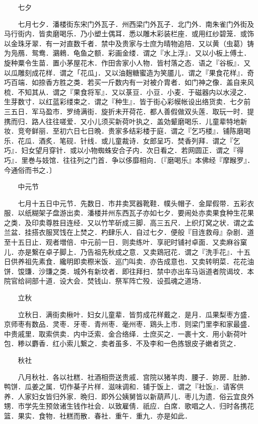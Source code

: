 　　七夕

　　七月七夕．潘楼街东宋门外瓦子．州西梁门外瓦子．北门外．南朱雀门外街及马行街内．皆卖磨喝乐．乃小塑土偶耳．悉以雕木彩装栏座．或用红纱碧笼．或饰以金珠牙翠．有一对直数千者．禁中及贵家与士庶为晴物追陪．又以黄（虫葛）铸为凫鴈．鸳鸯．鸂鶆．龟鱼之额．彩画金缕．谓之『水上浮』．又以小板上傅土．旋种粟令生苗．置小茅屋花木．作田舎家小人物．皆村落之态．语之『谷板』．又以瓜雕刻成花样．谓之「花瓜」．又以油麹糖蜜造为笑靥儿．谓之『果食花样』．奇巧百端．如捺香方胜之类．若买一斤数内有一对被介胄者．如门神之像．盖自来风梳．不知其从．谓之『果食将军』．又以菉豆．小豆．小麦．于磁器内以水浸之．生芽数寸．以红蓝彩缕束之．谓之『种生』．皆于街心彩幙帐设出络货卖．七夕前三五日．军马盈市．罗绮满街．旋折未开荷花．都人善假做双头莲．取玩一时．提携而归．路人往往嗟爱．又小儿须买新荷叶执之．盖効颦磨喝乐．儿童辈特地新妆．竞夸鲜丽．至初六日七日晩．贵家多结彩楼于庭．谓之『乞巧楼』．铺陈磨喝乐．花瓜．酒炙．笔砚．针线．或儿童裁诗．女郎呈巧．焚香列拜．谓之『乞巧』．妇女望月穿针．或以小物蜘蛛安合子内．次日看之．若网圆正．谓之『得巧』．里巻与妓馆．往往列之门首．争以侈靡相向．〔『磨喝乐』本佛经『摩睺罗』．今通俗而书之．〕

　　中元节

　　七月十五日中元节．先数日．市井卖冥器靴鞋．幞头帽子．金犀假带．五彩衣服．以纸糊架子盘游出卖．潘楼并州东西瓦子亦如七夕．要闹处亦卖果食种生花果之类．及印卖尊胜目连经．又以竹竿斫成三脚．高三五尺．上织灯窝之状．谓之孟兰盆．挂搭衣服冥饯在上焚之．杓肆乐人．自过七夕．便般『目连救母』杂剧．道至十五日止．观者増倍．中元前一日．则卖练叶．享祀时铺衬卓面．又卖麻谷窠儿．亦是繋在卓子脚上．乃告祖先秋成之意．又卖鶏冠花．谓之『洗手花』．十五日供养祖先素食．纔明即卖穄米饭．巡门叫卖．亦告成意也．又卖转明菜．花花油饼．馂豏．沙豏之类．城外有新坟者．即往拜扫．禁中亦出车马诣道者院谒坟．本院官给祠部十道．设大会．焚钱山．祭军阵亡殁．设孤魂之道场．

　　立秋

　　立秋日．满街卖楸叶．妇女儿童辈．皆剪成花样戴之．是月．瓜果梨枣方盛．京师枣有数品．灵枣．牙枣．青州枣．毫州枣．鶏头上市．则梁门里李和家最盛．中贵戚里．取索供卖．内中泛索．金合络绎．士庶买之．一裹十文．用小新荷叶包．糁以麝香．红小索儿繋之．卖者虽多．不及李和一色拣银皮子嫩者货之．

　　秋社

　　八月秋社．各以社糕．社酒相赍送贵戚．宫院以猪羊肉．腰子．妳房．肚肺．鸭饼．瓜姜之属．切作棊子片样．滋味调和．铺于饭上．谓之『社饭』．请客供养．人家妇女皆归外家．晩归．即外公姨舅皆以新葫芦儿．枣儿为遗．俗云宜良外甥．市学先生预敛诸生钱作社会．以致雇倩．祇应．白席．歌唱之人．归时各携花篮．果实．食物．社糕而散．春社．重午．重九．亦是如此．

